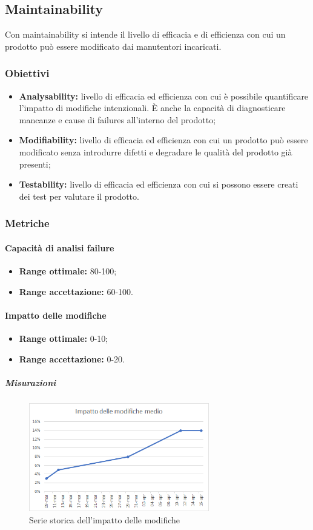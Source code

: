	\subsection{Maintainability}
		Con maintainability si intende il livello di efficacia e di efficienza con cui un prodotto può essere modificato dai manutentori incaricati.
		\subsubsection{Obiettivi}
		\begin{itemize}
			\item {\textbf{Analysability:} livello di efficacia ed efficienza con cui è possibile quantificare l'impatto di modifiche intenzionali. È anche la capacità di diagnosticare mancanze e cause di failures all'interno del prodotto; }
			\item{\textbf{Modifiability:} livello di efficacia ed efficienza con cui un prodotto può essere modificato senza introdurre difetti e degradare le qualità del prodotto già presenti;}
			\item{\textbf{Testability:} livello di efficacia ed efficienza con cui si possono essere creati dei test per valutare il prodotto.}
		\end{itemize}
		\subsubsection{Metriche}
			\paragraph{Capacità di analisi failure} \Spazio
			\begin{itemize}
				\item {\textbf{Range ottimale:} 80-100;}
				\item {\textbf{Range accettazione:} 60-100.}
			\end{itemize} 
			\paragraph{Impatto delle modifiche} \Spazio
			\begin{itemize}
				\item {\textbf{Range ottimale:} 0-10;}
				\item {\textbf{Range accettazione:} 0-20.}
			\end{itemize} 
		 \subparagraph{Misurazioni}
		\begin{figure}[H]
			\centering 
			\includegraphics[width=0.7\textwidth]{images/modifiche.png}
			\caption{Serie storica dell'impatto delle modifiche}
			\label{modifiche} 
		\end{figure}
